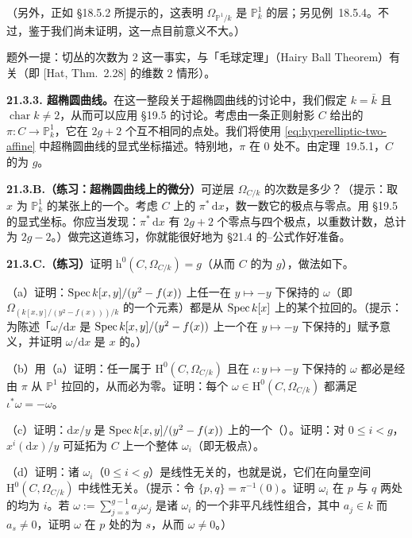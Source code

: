 （另外，正如 \S18.5.2 所提示的，这表明 $\Omega_{\mathbb{P}^1/k}$ 是 $\mathbb{P}^1_k$ 的\trCanonical{}层；另见\mbox{例~18.5.4}。不过，鉴于我们尚未证明\trSerreDuality，这一点目前意义不大。）

题外一提：切丛的次数为 $2$ 这一事实，与「毛球定理」（Hairy Ball Theorem）有关（即 [Hat, Thm.~2.28] 的维数 $2$ 情形）。

\textbf{21.3.3. 超椭圆曲线。}\quad 在这一整段关于超椭圆曲线的讨论中，我们假定 $k=\bar{k}$ 且 $\operatorname{char}k\ne2$，从而可以应用 \S19.5 的讨论。考虑由一条正则射影\trCurve{} $C$ 给出的\trDoubleCover{} $\pi\colon C\to\mathbb{P}^1_k$，它在 $2g+2$ 个互不相同的点处\trRamification。我们将使用 \eqref{eq:hyperelliptic-two-affine} 中超椭圆曲线的显式坐标描述。特别地，$\pi$ 在 $0$ 处不\trRamification。由\mbox{定理~19.5.1}，$C$ 的\trGenus{}为 $g$。

\textbf{21.3.B.（练习：超椭圆曲线上的微分）}\quad 可逆层 $\Omega_{C/k}$ 的次数是多少？（提示：取 $x$ 为 $\mathbb{P}^1_k$ 的某张\trCoordinatePatch{}上的一个\trCoordinate。考虑 $C$ 上的 $\pi^*\,\mathrm{d}x$，数一数它的极点与零点。用 \S19.5 的显式坐标。你应当发现：$\pi^*\,\mathrm{d}x$ 有 $2g+2$ 个零点与四个极点，以重数计数，总计为 $2g-2$。）做完这道练习，你就能很好地为 \S21.4 的\trRiemann--\trHurwitz{}公式作好准备。

\textbf{21.3.C.（练习）}\quad 证明 $\mathrm{h}^0(C,\Omega_{C/k})=g$（从而 $C$ 的\trGeometricGenus{}为 $g$），做法如下。

（a）证明：$\operatorname{Spec} k[x,y]/(y^2-f(x))$ 上任一在\trInvolution{} $y\mapsto -y$ 下保持的\trRegular{}\trDifferential{} $\omega$（即 $\Omega_{(k[x,y]/(y^2-f(x)))/k}$ 的一个元素）都是从 $\operatorname{Spec} k[x]$ 上的某个\trDifferential{}拉回的。（提示：为陈述「$\omega/\mathrm{d}x$ 是 $\operatorname{Spec} k[x,y]/(y^2-f(x))$ 上一个在\trInvolution{} $y\mapsto -y$ 下保持的\trRationalFunction」赋予意义，并证明 $\omega/\mathrm{d}x$ 是 $x$ 的\trRationalFunction。）

（b）用（a）证明：任一属于 $\mathrm{H}^0(C,\Omega_{C/k})$ 且在\trInvolution{} $\iota\colon y\mapsto -y$ 下保持的\trDifferential{} $\omega$ 都必是经由 $\pi$ 从 $\mathbb{P}^1$ 拉回的，从而必为零。证明：每个\trDifferential{} $\omega\in\mathrm{H}^0(C,\Omega_{C/k})$ 都满足 $\iota^*\omega=-\omega$。

（c）证明：$\mathrm{d}x/y$ 是 $\operatorname{Spec} k[x,y]/(y^2-f(x))$ 上的一个（\trRegular）\trDifferential。证明：对 $0\le i<g$，$x^i(\mathrm{d}x)/y$ 可延拓为 $C$ 上一个整体\trDifferential{} $\omega_i$（即无极点）。

（d）证明：诸 $\omega_i$（$0\le i<g$）是线性无关的\trDifferential，也就是说，它们在向量空间 $\mathrm{H}^0(C,\Omega_{C/k})$ 中线性无关。（提示：令 $\{p,q\}=\pi^{-1}(0)$。证明 $\omega_i$ 在 $p$ 与 $q$ 两处的\trValuation{}均为 $i$。若 $\omega:=\sum_{j=s}^{g-1}a_j\omega_j$ 是诸 $\omega_i$ 的一个非平凡线性组合，其中 $a_j\in k$ 而 $a_s\ne0$，证明 $\omega$ 在 $p$ 处的\trValuation{}为 $s$，从而 $\omega\ne0$。）


